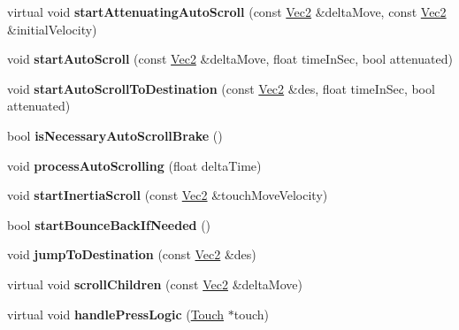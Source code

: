 \begin{DoxyCompactItemize}
virtual void {\bfseries start\+Attenuating\+Auto\+Scroll} (const \hyperlink{classVec2}{Vec2} \&delta\+Move, const \hyperlink{classVec2}{Vec2} \&initial\+Velocity)
\item 
\mbox{\label{classui_1_1ScrollView_ab348cb2ec43fbc4837a07b057bb0b268}} 
void {\bfseries start\+Auto\+Scroll} (const \hyperlink{classVec2}{Vec2} \&delta\+Move, float time\+In\+Sec, bool attenuated)
\item 
\mbox{\label{classui_1_1ScrollView_a6f5dd1366abef1f275420c502932c956}} 
void {\bfseries start\+Auto\+Scroll\+To\+Destination} (const \hyperlink{classVec2}{Vec2} \&des, float time\+In\+Sec, bool attenuated)
\item 
\mbox{\label{classui_1_1ScrollView_a542e60383775fdbaab63f856d10a1421}} 
bool {\bfseries is\+Necessary\+Auto\+Scroll\+Brake} ()
\item 
\mbox{\label{classui_1_1ScrollView_af57adf13b70ba77406c9a78fdbf9f7a7}} 
void {\bfseries process\+Auto\+Scrolling} (float delta\+Time)
\item 
\mbox{\label{classui_1_1ScrollView_a147b33691bd771cc39aa0d6a275c0e97}} 
void {\bfseries start\+Inertia\+Scroll} (const \hyperlink{classVec2}{Vec2} \&touch\+Move\+Velocity)
\item 
\mbox{\label{classui_1_1ScrollView_aaa30c891f8dff22d464fb1d98910da6a}} 
bool {\bfseries start\+Bounce\+Back\+If\+Needed} ()
\item 
\mbox{\label{classui_1_1ScrollView_a913a69c5aacbcee6b49350ecf2fac7dc}} 
void {\bfseries jump\+To\+Destination} (const \hyperlink{classVec2}{Vec2} \&des)
\item 
\mbox{\label{classui_1_1ScrollView_a6f91229a105a12f125904c8ab0f5433d}} 
virtual void {\bfseries scroll\+Children} (const \hyperlink{classVec2}{Vec2} \&delta\+Move)
\item 
\mbox{\label{classui_1_1ScrollView_aed007c7e44a14caa5541dc033558004d}} 
virtual void {\bfseries handle\+Press\+Logic} (\hyperlink{classTouch}{Touch} $\ast$touch)

\end{DoxyCompactItemize}
